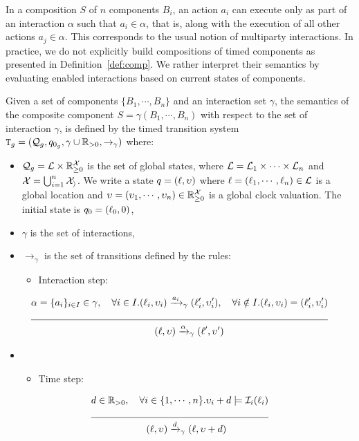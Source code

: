 In a composition $S$ of $n$ components $B_i$, an action $a_i$ can execute only as part
of an interaction $\alpha$ such that $a_i\in\alpha$, that is, along with the 
execution of all other actions $a_j\in\alpha$. This corresponds to the usual 
notion of multiparty interactions.
In practice, we do not explicitly build compositions of timed components as 
presented in Definition~\ref{def:comp}. We rather interpret their semantics by 
evaluating enabled interactions based on current states of components. 
\begin{property}\label{pr:std_sem}
  Given a set of components $\{B_1,\cdots,B_n\}$ and an interaction set $\gamma$,
  the semantics of the composite component $S=\gamma(B_1,\cdots,B_n)$
  with respect to the set of interaction $\gamma$, is defined by 
  the timed transition system $\texttt{T}_g=(\mathcal{Q}_g,q_{0_g},\gamma\cup\mathbb{R}_{> 0},\to_{\gamma})$ where:
  \begin{itemize}
    \item $\mathcal{Q}_g=\mathcal{L}\times\mathbb{R}_{\ge 0}^{\mathcal{X}}$ is the set of global states, where
      $\mathcal{L}=\mathcal{L}_1\times\cdots\times\mathcal{L}_n$ and $\mathcal{X}=\bigcup_{i=1}^n\mathcal{X_i}$.
      We write a state $q=(\ell,\upsilon)$ where $\ell=(\ell_1,\cdots,\ell_n)\in\mathcal{L}$
      is a global location and $\upsilon=(\upsilon_1,\cdots,\upsilon_n)\in\mathbb{R}_{\ge 0}^{\mathcal{X}}$ is a global 
      clock valuation. The initial state is $q_0=(\ell_0,0)$,
    \item $\gamma$ is the set of interactions,
    \item $\to_{\gamma}$ is the set of transitions defined by the rules:
    \begin{itemize}
      \item Interaction step: \\
      \end{itemize}
  \end{itemize}
  \vspace*{-1cm}
  \begin{align*}
    & \alpha=\{a_i\}_{i\in I}\in\gamma,\quad\forall i\in{I}.(\loc_i,\val_i)
    \transitb{a_i}{\gamma}(\loc'_i,\val'_i),\quad\forall i\notin{I}.
    (\loc_i,\val_i)=(\loc'_i,\val'_i)\\
    \cline{1-2}
   &\hspace{4.5cm}(\loc,\val)\transitb{\alpha}{\gamma}(\loc',\val')
 \end{align*}
  \vspace*{-1.5cm}
  \begin{itemize}
    \item[] 
      \begin{itemize}
      \item Time step:
    \end{itemize}
  \end{itemize}
  \vspace*{-5mm}
  \begin{align*}
    & d\in\realpos,\quad\forall i\in\{1,\cdots,n\}
    .\val_i+d\models\Invi{\loc_i}{i}\\
    \cline{1-2}
   &\hspace{2cm}(\loc,\val)\transitb{d}{\gamma}(\loc,\val+d)
 \end{align*}
\end{property}

